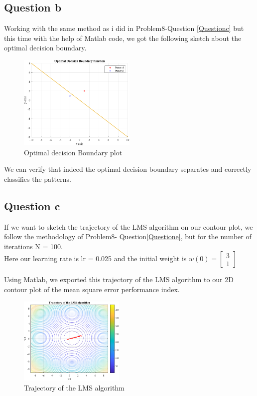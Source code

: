 \subsection{Question b}
Working with the same method as i did in Problem8-Question \ref{Questionc} but this time with the help of Matlab code, we got the following sketch about the optimal decision boundary.

\begin{figure}[H]
	\centering
	\includegraphics[width=0.5\textwidth]{../Problem 9/patterns.pdf}
	\caption{Optimal decision Boundary plot}
	\label{fig:OpDecBo}
\end{figure}

We can verify that indeed the optimal decision boundary separates and correctly classifies the patterns.

\subsection{Question c}
If we want to sketch the trajectory of the LMS algorithm on our contour plot, we follow the methodology of Problem8- Question\ref{Questione}, but for the number of iterations N = 100.\\
Here our learning rate is lr = 0.025 and the initial weight is $w(0) = \left[
\begin{array}{c}
	3 \\
	1
\end{array}
\right]
$

Using Matlab, we exported this trajectory of the LMS algorithm to our 2D contour plot of the mean square error performance index.
\begin{figure}[H]
	\centering
	\includegraphics[width=0.45\textwidth]{../Problem 9/contour_2d_traj.pdf}
	\caption{Trajectory of the LMS algorithm}
	\label{fig:trajectory}
\end{figure}


